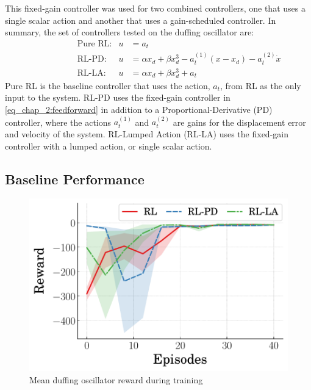 %
This fixed-gain controller was used for two combined controllers, one that uses a single scalar action and another that uses a gain-scheduled controller. In summary, the set of controllers tested on the duffing oscillator are:
%
\begin{align}
    &\qquad\qquad\text{Pure RL:} & u&=a_t \qquad\qquad\qquad\\
    &\qquad\qquad\text{RL-PD:} & u&=\alpha x_d + \beta x_d^3 - a_t^{(1)}(x-x_d) - a_t^{(2)} \dot{x}\\
    &\qquad\qquad\text{RL-LA:} & u&=\alpha x_d + \beta x_d^3 + a_t \qquad\qquad\qquad
\end{align}
%
Pure RL is the baseline controller that uses the action, $a_t$, from RL as the only input to the system. RL-PD uses the fixed-gain controller in \eqref{eq_chap_2:feedforward} in addition to a Proportional-Derivative (PD) controller, where the actions $a_t^{(1)}$ and $a_t^{(2)}$ are gains for the displacement error and velocity of the system. RL-Lumped Action (RL-LA) uses the fixed-gain controller with a lumped action, or single scalar action. 

\subsection{Baseline Performance}
%
\begin{figure}[tb]
    \centering
      \includegraphics[width=0.65\columnwidth]{figures/figures_RL_model_based_control/duffing_mean_reward_v_episode}
      \vspace{-2ex}
      \caption{Mean duffing oscillator reward during training}
      \label{fig_chap2:duffing_reward_trend}
    \end{figure}

